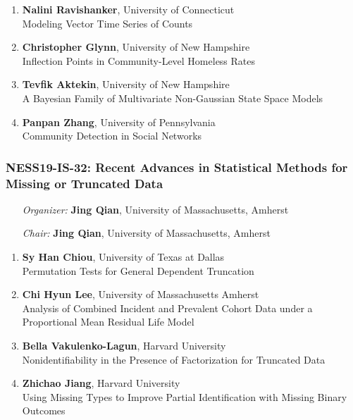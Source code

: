 \begin{enumerate}
\item \textbf{Nalini Ravishanker}, University of Connecticut \\
Modeling Vector Time Series of Counts
\item \textbf{Christopher Glynn}, University of New Hampshire \\
Inflection Points in Community-Level Homeless Rates
\item \textbf{Tevfik Aktekin}, University of New Hampshire \\
A Bayesian Family of Multivariate Non-Gaussian State Space Models
\item \textbf{Panpan Zhang}, University of Pennsylvania \\
Community Detection in Social Networks
\end{enumerate}

\subsubsection*{NESS19-IS-32: Recent Advances in Statistical Methods for Missing or Truncated Data}

\begin{enumerate}[align=left]
\item [\emph{Organizer:}] \textbf{Jing Qian}, University of Massachusetts, Amherst
\item [\emph{Chair:}] \textbf{Jing Qian}, University of Massachusetts, Amherst
\end{enumerate}

\begin{enumerate}
\item \textbf{Sy Han Chiou}, University of Texas at Dallas \\
Permutation Tests for General Dependent Truncation
\item \textbf{Chi Hyun Lee}, University of Massachusetts Amherst \\
Analysis of Combined Incident and Prevalent Cohort Data under a Proportional Mean Residual Life Model
\item \textbf{Bella Vakulenko-Lagun}, Harvard University \\
Nonidentifiability in the Presence of Factorization for Truncated Data
\item \textbf{Zhichao Jiang}, Harvard University \\
Using Missing Types to Improve Partial Identification with Missing Binary Outcomes
\end{enumerate}

